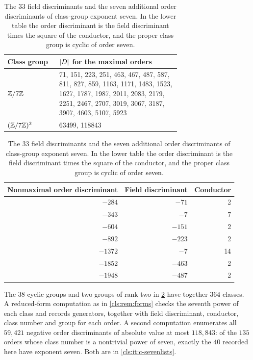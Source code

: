 \begin{table}[ht]
\centering
\begin{tabular}{lp{0.70\linewidth}}\toprule
Class group & $\lvert D\rvert$ for the maximal orders\\\midrule
$\mathbb{Z}/7\mathbb{Z}$ & 71, 151, 223, 251, 463, 467, 487, 587, 811, 827, 859, 1163, 1171, 1483, 1523,
1627, 1787, 1987, 2011, 2083, 2179, 2251, 2467, 2707, 3019, 3067, 3187, 3907, 4603, 5107,
5923 \\[3pt]
$(\mathbb{Z}/7\mathbb{Z})^2$ & 63499, 118843 \\\bottomrule
\end{tabular}

\medskip
\begin{tabular}{rrr}\toprule
Nonmaximal order discriminant & Field discriminant & Conductor\\\midrule
$-284$ & $-71$ &2\\
$-343$ & $-7$ &7\\
$-604$ & $-151$ &2\\
$-892$ & $-223$ &2\\
$-1372$ & $-7$ &14\\
$-1852$ & $-463$ &2\\
$-1948$ & $-487$ &2\\\bottomrule
\end{tabular}
\caption{The $33$ field discriminants and the seven additional order discriminants of
class-group exponent seven. In the lower table the order discriminant is the field
discriminant times the square of the conductor, and the proper class group is cyclic of
order seven.}\label{cls:tab:seven}
\end{table}

\begin{remark}\label{cls:rem:sevenlists}
The $38$ cyclic groups and two groups of rank two in \cref{cls:tab:seven} have together
$364$ classes. A reduced-form computation as in \cref{cls:rem:forms} checks the seventh
power of each class and records generators, together with field discriminant, conductor,
class number and group for each order. A second computation enumerates all $59{,}421$
negative order discriminants of absolute value at most $118{,}843$: of the $135$ orders
whose class number is a nontrivial power of seven, exactly the $40$ recorded here have
exponent seven. Both are in \ref{cls:it:c-sevenlists}.
\end{remark}

